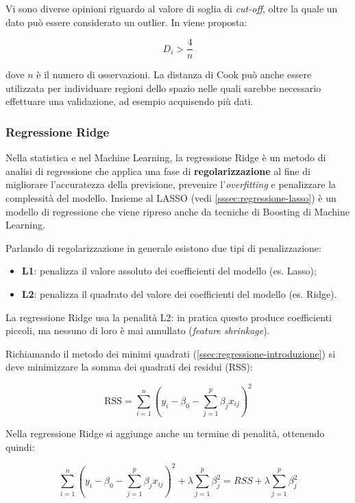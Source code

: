 Vi sono diverse opinioni riguardo al valore di soglia di \textit{cut-off}, oltre la quale un dato può essere considerato un outlier. In \cite{applied_regression} viene proposta:

$$D_{i}>\frac{4}{n}$$\smallskip

dove $n$ è il numero di osservazioni. La distanza di Cook può anche essere utilizzata per individuare regioni dello spazio nelle quali sarebbe necessario effettuare una validazione, ad esempio acquisendo più dati.

\subsubsection{Regressione Ridge}\label{sssec:regressione-ridge}
Nella statistica e nel Machine Learning, la regressione Ridge è un metodo di analisi di regressione che applica una fase di \textbf{regolarizzazione} al fine di migliorare l'accuratezza della previsione, prevenire l'\textit{overfitting} e penalizzare la complessità del modello.
Insieme al LASSO (vedi \ref{sssec:regressione-lasso}) è un modello di regressione che viene ripreso anche da tecniche di Boosting di Machine Learning.

Parlando di regolarizzazione in generale esistono due tipi di penalizzazione:
\begin{itemize}
  \item \textbf{L1}: penalizza il valore assoluto dei coefficienti del modello (es. Lasso); 
  \item \textbf{L2}: penalizza il quadrato del valore dei coefficienti del modello (es. Ridge).
\end{itemize}

La regressione Ridge usa la penalità L2: in pratica questo produce coefficienti piccoli, ma nessuno di loro è mai annullato (\textit{feature shrinkage}).

Richiamando il metodo dei minimi quadrati (\ref{ssec:regressione-introduzione}) si deve minimizzare la somma dei quadrati dei residui (RSS):

$$\mathrm{RSS}=\sum_{i=1}^{n}\left(y_{i}-\beta_{0}-\sum_{j=1}^{p} \beta_{j} x_{i j}\right)^{2}$$\smallskip

Nella regressione Ridge si aggiunge anche un termine di penalità, ottenendo quindi:

$$\sum_{i=1}^{n}\left(y_{i}-\beta_{0}-\sum_{j=1}^{p} \beta_{j} x_{i j}\right)^{2}+\lambda \sum_{j=1}^{p} \beta_{j}^{2}=R S S+\lambda \sum_{j=1}^{p} \beta_{j}^{2}$$\smallskip

